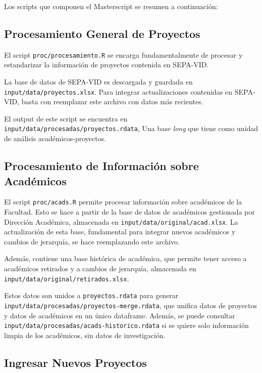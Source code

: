 \documentclass[
  spanish,
  letterpaper,
  DIV=11,
  numbers=noendperiod]{scrreprt}
\begin{document}
Los scripts que componen el Masterscript se resumen a continuación:

\subsection{Procesamiento General de
Proyectos}\label{procesamiento-general-de-proyectos}

El script \texttt{proc/procesamiento.R} se encarga fundamentalmente de
procesar y estandarizar la información de proyectos contenida en
SEPA-VID.

La base de datos de SEPA-VID es descargada y guardada en
\texttt{input/data/proyectos.xlsx}. Para integrar actualizaciones
contenidas en SEPA-VID, basta con reemplazar este archivo con datos más
recientes.

El output de este script se encuentra en
\texttt{input/data/procesadas/proyectos.rdata}, Una base \emph{long} que
tiene como unidad de análisis académicos-proyectos.

\subsection{Procesamiento de Información sobre
Académicos}\label{procesamiento-de-informaciuxf3n-sobre-acaduxe9micos}

El script \texttt{proc/acads.R} permite procesar información sobre
académicos de la Facultad. Esto se hace a partir de la base de datos de
académicos gestionada por Dirección Académica, almacenada en
\texttt{input/data/original/acad.xlsx}. La actualización de esta base,
fundamental para integrar nuevos académicos y cambios de jerarquía, se
hace reemplazando este archivo.

Además, contiene una base histórica de académica, que permite tener
acceso a académicos retirados y a cambios de jerarquía, almacenada en
\texttt{input/data/original/retirados.xlsx}.

Estos datos son unidos a \texttt{proyectos.rdata} para generar
\texttt{input/data/procesadas/proyectos-merge.rdata}, que unifica datos
de proyectos y datos de académicos en un único dataframe. Además, se
puede consultar \texttt{input/data/procesadas/acads-historico.rdata} si
se quiere solo información limpia de los académicos, sin datos de
investigación.

\subsection{Ingresar Nuevos Proyectos}\label{ingresar-nuevos-proyectos}
\end{document}
